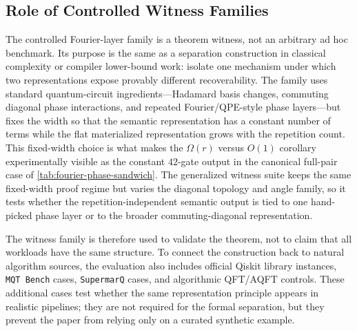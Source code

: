 \documentclass[11pt]{article}
\begin{document}
\subsection{Role of Controlled Witness Families}

The controlled Fourier-layer family is a theorem witness, not an arbitrary
ad hoc benchmark. Its purpose is the same as a separation construction in
classical complexity or compiler lower-bound work: isolate one mechanism under
which two representations expose provably different recoverability. The
family uses standard quantum-circuit ingredients---Hadamard basis changes,
commuting diagonal phase interactions, and repeated Fourier/QPE-style phase
layers---but fixes the width so that the semantic representation has a
constant number of terms while the flat materialized representation grows with
the repetition count. This fixed-width choice is what makes the
$\Omega(r)$ versus $O(1)$ corollary experimentally visible as the constant
$42$-gate output in the canonical full-pair case of
\cref{tab:fourier-phase-sandwich}. The generalized witness suite keeps the
same fixed-width proof regime but varies the diagonal topology and angle
family, so it tests whether the repetition-independent semantic output is tied
to one hand-picked phase layer or to the broader commuting-diagonal
representation.

The witness family is therefore used to validate the theorem, not to claim
that all workloads have the same structure. To connect the construction back
to natural algorithm sources, the evaluation also includes official Qiskit
library instances, \texttt{MQT Bench} cases, \texttt{SupermarQ} cases, and
algorithmic QFT/AQFT controls. These additional cases test whether the same
representation principle appears in realistic pipelines; they are not required
for the formal separation, but they prevent the paper from relying only on a
curated synthetic example.
\end{document}
